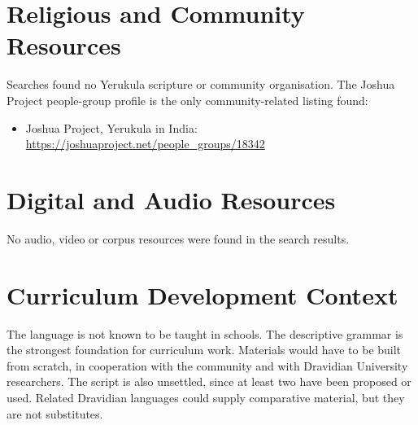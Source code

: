 \documentclass[12pt]{article}
\begin{document}
\section{Religious and Community Resources}
Searches found no Yerukula scripture or community organisation. The Joshua Project people-group profile is the only community-related listing found:
\begin{itemize}
\item Joshua Project, Yerukula in India: \url{https://joshuaproject.net/people_groups/18342}
\end{itemize}

\section{Digital and Audio Resources}
No audio, video or corpus resources were found in the search results.

\section{Curriculum Development Context}
The language is not known to be taught in schools. The descriptive grammar is the strongest foundation for curriculum work. Materials would have to be built from scratch, in cooperation with the community and with Dravidian University researchers. The script is also unsettled, since at least two have been proposed or used. Related Dravidian languages could supply comparative material, but they are not substitutes.
\end{document}
